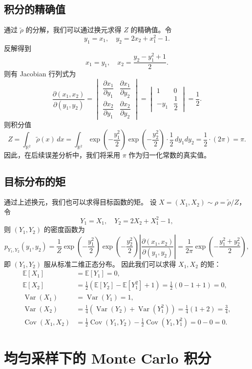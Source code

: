 \documentclass[12pt,a4paper]{ctexart}
\newcommand{\R}{\mathbb{R}}
\newcommand{\E}{\mathbb{E}}
\DeclareMathOperator{\Var}{Var}
\DeclareMathOperator{\Cov}{Cov}
\newcommand{\rhoT}{\widetilde{\rho}}
\begin{document}
\subsection{积分的精确值}

通过 $\rhoT$ 的分解，我们可以通过换元求得 $Z$ 的精确值。令
\[
y_1 = x_1, \quad y_2 = 2x_2 + x_1^2 - 1.
\]
反解得到
\[
x_1 = y_1, \quad x_2=\frac{y_2 - y_1^2 +1}{2}.
\]
则有 Jacobian 行列式为
\[
\frac{\partial(x_1, x_2)}{\partial(y_1, y_2)} = \begin{vmatrix}
\dfrac{\partial x_1}{\partial y_1} & \dfrac{\partial x_1}{\partial y_2} \\[1em]
\dfrac{\partial x_2}{\partial y_1} & \dfrac{\partial x_2}{\partial y_2}
\end{vmatrix} = \begin{vmatrix}
1 & 0 \\[1em]
-y_1 & \dfrac{1}{2}
\end{vmatrix} = \frac{1}{2}.
\]
则积分值
\[
Z = \int_{\R^2} \rhoT(x) \, dx = \int_{\R^2} \exp\left(-\frac{y_1^2}{2}\right) \exp\left(-\frac{y_2^2}{2}\right) \cdot \frac{1}{2} \, dy_1 dy_2 = \frac{1}{2} \cdot (2\pi) = \pi.
\]
因此，在后续误差分析中，我们将采用 $\pi$ 作为归一化常数的真实值。

\subsection{目标分布的矩}

通过上述换元，我们也可以求得目标函数的矩。
设 $X=(X_1,X_2) \sim \rho=\rhoT/Z$，令
\[
Y_1 = X_1, \quad Y_2 = 2X_2 + X_1^2 - 1,
\]
则 $(Y_1, Y_2)$ 的密度函数为
\[
p_{Y_1,Y_2}(y_1,y_2) = \frac{1}{Z} \exp\left(-\frac{y_1^2}{2}\right) \exp\left(-\frac{y_2^2}{2}\right) \left|\frac{\partial(x_1, x_2)}{\partial(y_1, y_2)}\right| = \frac{1}{2\pi} \exp\left(-\frac{y_1^2+y_2^2}{2}\right),
\]
即 $(Y_1, Y_2)$ 服从标准二维正态分布。
因此我们可以求得 $X_1, X_2$ 的矩：
\begin{align*}
    \E[X_1] &= \E[Y_1] = 0, \\
    \E[X_2] &= \frac{1}{2}(\E[Y_2] - \E[Y_1^2] + 1) = \frac{1}{2}(0 - 1 + 1) = 0, \\
    \Var(X_1) &= \Var(Y_1) = 1, \\
    \Var(X_2) &= \frac{1}{4}(\Var(Y_2) + \Var(Y_1^2)) = \frac{1}{4}(1 + 2) = \frac{3}{4}, \\
    \Cov(X_1, X_2) &= \frac12\Cov(Y_1, Y_2) - \frac12\Cov(Y_1, Y_1^2) = 0 - 0 = 0.
\end{align*}

\section{均匀采样下的 Monte Carlo 积分}
\end{document}
